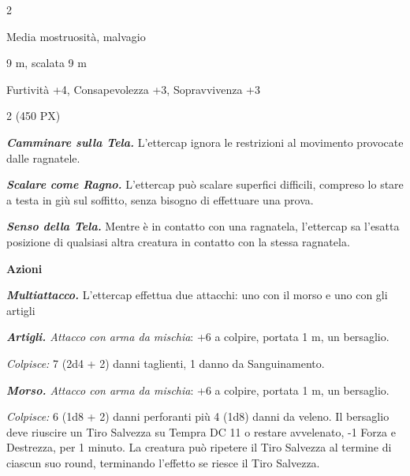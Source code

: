 \begin{multicols}{2}
{
\begin{description}[noitemsep, topsep=0pt, parsep=0pt, partopsep=0pt, itemsep=1pt, leftmargin=2.35cm,  labelwidth=2.2cm, itemindent=0cm, listparindent=0pt] %
\setlength{\baselineskip}{10pt}
\item[\textbf{Taglia/Tipo}] Media mostruosità, malvagio
\item[\textbf{Caratt.}] 
\item[\textbf{Punti Ferita}] 
\item[\textbf{Movimento}] 9 m, scalata 9 m
\item[\textbf{Tiri Salvez.}] 
\item[\textbf{Comp.}] Furtività +4, Consapevolezza +3, Sopravvivenza +3
\item[\textbf{Sensi}] 
\item[\textbf{Sfida}] 2 (450 PX)
\end{description}
\smallskip

\emph{\textbf{Camminare sulla Tela.}} L'ettercap ignora le restrizioni al movimento provocate dalle ragnatele.

\emph{\textbf{Scalare come Ragno.}} L'ettercap può scalare superfici difficili, compreso lo stare a testa in giù sul soffitto, senza bisogno di effettuare una prova.

\emph{\textbf{Senso della Tela.}} Mentre è in contatto con una ragnatela, l'ettercap sa l'esatta posizione di qualsiasi altra creatura in contatto con la stessa ragnatela.

\textbf{Azioni}

\emph{\textbf{Multiattacco.}} L'ettercap effettua due attacchi: uno con il morso e uno con gli artigli

\emph{\textbf{Artigli.} Attacco con arma da mischia}: +6 a colpire, portata 1 m, un bersaglio.

\emph{Colpisce:} 7 (2d4 + 2) danni taglienti, 1 danno da Sanguinamento.

\emph{\textbf{Morso.} Attacco con arma da mischia}: +6 a colpire, portata 1 m, un bersaglio.

\emph{Colpisce:} 6 (1d8 + 2) danni perforanti più 4 (1d8) danni da veleno. Il bersaglio deve riuscire un Tiro Salvezza su Tempra DC 11 o restare avvelenato, -1 Forza e Destrezza, per 1 minuto. La creatura può ripetere il Tiro Salvezza al termine di ciascun suo round, terminando l'effetto se riesce il Tiro Salvezza.

}
\end{multicols}
